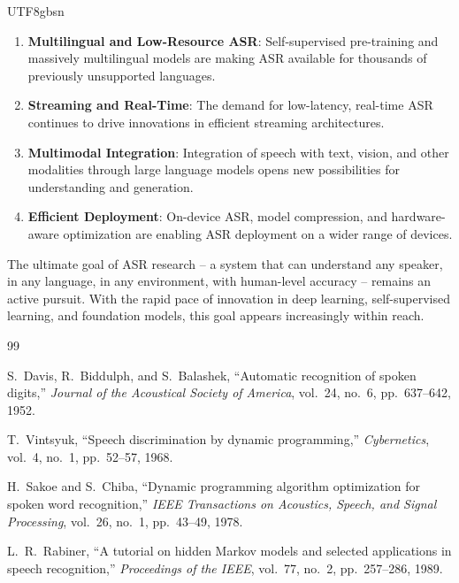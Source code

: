 \documentclass[12pt,a4paper]{article}
\begin{document}
\begin{CJK}{UTF8}{gbsn}
\begin{enumerate}[leftmargin=*]
    \item \textbf{Multilingual and Low-Resource ASR}: Self-supervised pre-training and massively multilingual models are making ASR available for thousands of previously unsupported languages.

    \item \textbf{Streaming and Real-Time}: The demand for low-latency, real-time ASR continues to drive innovations in efficient streaming architectures.

    \item \textbf{Multimodal Integration}: Integration of speech with text, vision, and other modalities through large language models opens new possibilities for understanding and generation.

    \item \textbf{Efficient Deployment}: On-device ASR, model compression, and hardware-aware optimization are enabling ASR deployment on a wider range of devices.
\end{enumerate}

The ultimate goal of ASR research -- a system that can understand any speaker, in any language, in any environment, with human-level accuracy -- remains an active pursuit. With the rapid pace of innovation in deep learning, self-supervised learning, and foundation models, this goal appears increasingly within reach.

\newpage

\begin{thebibliography}{99}

S.~Davis, R.~Biddulph, and S.~Balashek,
``Automatic recognition of spoken digits,''
\textit{Journal of the Acoustical Society of America}, vol.~24, no.~6, pp.~637--642, 1952.

T.~Vintsyuk,
``Speech discrimination by dynamic programming,''
\textit{Cybernetics}, vol.~4, no.~1, pp.~52--57, 1968.

H.~Sakoe and S.~Chiba,
``Dynamic programming algorithm optimization for spoken word recognition,''
\textit{IEEE Transactions on Acoustics, Speech, and Signal Processing}, vol.~26, no.~1, pp.~43--49, 1978.

L.~R.~Rabiner,
``A tutorial on hidden Markov models and selected applications in speech recognition,''
\textit{Proceedings of the IEEE}, vol.~77, no.~2, pp.~257--286, 1989.


\end{thebibliography}
\end{CJK}
\end{document}
